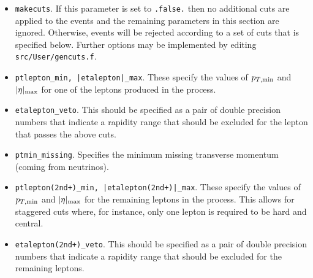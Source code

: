 \documentclass[12pt]{article}
\begin{document}
\begin{itemize}
\item {\tt makecuts}. If this parameter is set to {\tt .false.} then
no additional cuts are applied to the events and the remaining
parameters in this section are ignored. Otherwise, events will
be rejected according to a set of cuts that is specified below.
Further options may be implemented by editing {\tt src/User/gencuts.f}.

\item {\tt ptlepton\_min, |etalepton|\_max}. These specify the values
of $p_{T,{\rm min}}$ and $|\eta|_{\rm max}$ for one of the leptons produced
in the process.

\item {\tt etalepton\_veto}. This should be specified as a pair of double
precision numbers that indicate a rapidity range that should be excluded
for the lepton that passes the above cuts.

\item {\tt ptmin\_missing}. Specifies the minimum missing transverse
momentum (coming from neutrinos).

\item {\tt ptlepton(2nd+)\_min, |etalepton(2nd+)|\_max}. These specify
the values of $p_{T,{\rm min}}$ and $|\eta|_{\rm max}$ for the remaining
leptons in the process. This allows for staggered cuts where, for
instance, only one lepton is required to be hard and central.

\item {\tt etalepton(2nd+)\_veto}. This should be specified as a pair of double
precision numbers that indicate a rapidity range that should be excluded
for the remaining leptons.


\end{itemize}
\end{document}
